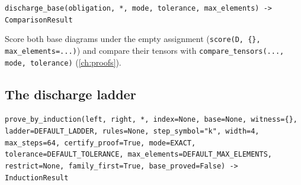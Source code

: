 \begin{signature}
\texttt{discharge\_\allowbreak{}base(\allowbreak{}obligation,\allowbreak{} *,\allowbreak{} mode,\allowbreak{} tolerance,\allowbreak{} max\_\allowbreak{}elements) -> ComparisonResult}

Score both base diagrams under the empty assignment (\texttt{score(\allowbreak{}D,\allowbreak{} \{\},\allowbreak{} max\_\allowbreak{}elements=.\allowbreak{}.\allowbreak{}.\allowbreak{})}) and compare their tensors with \texttt{compare\_\allowbreak{}tensors(\allowbreak{}.\allowbreak{}.\allowbreak{}.\allowbreak{},\allowbreak{} mode,\allowbreak{} tolerance)} (\cref{ch:proofs}).
\end{signature}

\subsection{The discharge ladder}\label{sec:kernel-ladder}

\begin{signature}
\texttt{prove\_\allowbreak{}by\_\allowbreak{}induction(\allowbreak{}left,\allowbreak{} right,\allowbreak{} *,\allowbreak{} index=None,\allowbreak{} base=None,\allowbreak{} witness=\{\},\allowbreak{} ladder=DEFAULT\_\allowbreak{}LADDER,\allowbreak{} rules=None,\allowbreak{} step\_\allowbreak{}symbol="k",\allowbreak{} width=4,\allowbreak{} max\_\allowbreak{}steps=64,\allowbreak{} certify\_\allowbreak{}proof=True,\allowbreak{} mode=EXACT,\allowbreak{} tolerance=DEFAULT\_\allowbreak{}TOLERANCE,\allowbreak{} max\_\allowbreak{}elements=DEFAULT\_\allowbreak{}MAX\_\allowbreak{}ELEMENTS,\allowbreak{} restrict=None,\allowbreak{} family\_\allowbreak{}first=True,\allowbreak{} base\_\allowbreak{}proved=False) -> InductionResult}
\end{signature}

